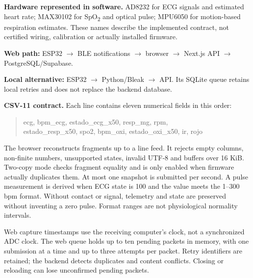 \newpage
{}
\textbf{Hardware represented in software.} AD8232 for ECG signals and estimated heart rate; MAX30102 for SpO\textsubscript{2} and optical pulse; MPU6050 for motion-based respiration estimates. These names describe the implemented contract, not certified wiring, calibration or actually installed firmware.
\begin{infobox}
\textbf{Web path:} ESP32 $\rightarrow$ BLE notifications $\rightarrow$ browser $\rightarrow$ Next.js API $\rightarrow$ PostgreSQL/Supabase.\par
\textbf{Local alternative:} ESP32 $\rightarrow$ Python/Bleak $\rightarrow$ API. Its SQLite queue retains local retries and does not replace the backend database.
\end{infobox}
\textbf{CSV-11 contract.} Each line contains eleven numerical fields in this order:
\begin{quote}\small\ttfamily ecg, bpm\_ecg, estado\_ecg\_x50, resp\_mg, rpm,\\ estado\_resp\_x50, spo2, bpm\_oxi, estado\_oxi\_x50, ir, rojo\end{quote}
The browser reconstructs fragments up to a line feed. It rejects empty columns, non-finite numbers, unsupported states, invalid UTF-8 and buffers over 16 KiB. Two-copy mode checks fragment equality and is only enabled when firmware actually duplicates them.
At most one snapshot is submitted per second. A pulse measurement is derived when ECG state is 100 and the value meets the 1--300 bpm format. Without contact or signal, telemetry and state are preserved without inventing a zero pulse. Format ranges are not physiological normality intervals.

Web capture timestamps use the receiving computer's clock, not a synchronized ADC clock. The web queue holds up to ten pending packets in memory, with one submission at a time and up to three attempts per packet. Retry identifiers are retained; the backend detects duplicates and content conflicts. Closing or reloading can lose unconfirmed pending packets.

